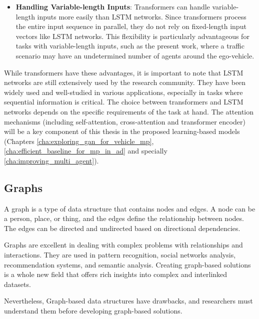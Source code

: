 \begin{itemize}
	\item \textbf{Handling Variable-length Inputs}: Transformers can handle variable-length inputs more easily than \ac{LSTM} networks. Since transformers process the entire input sequence in parallel, they do not rely on fixed-length input vectors like \ac{LSTM} networks. This flexibility is particularly advantageous for tasks with variable-length inputs, such as the present work, where a traffic scenario may have an undetermined number of agents around the ego-vehicle.
	
\end{itemize}

While transformers have these advantages, it is important to note that \ac{LSTM} networks are still extensively used by the research community. They have been widely used and well-studied in various applications, especially in tasks where sequential information is critical. The choice between transformers and \ac{LSTM} networks depends on the specific requirements of the task at hand. The attention mechanisms (including self-attention, cross-attention and transformer encoder) will be a key component of this thesis in the proposed learning-based models (Chapters \ref{cha:exploring_gan_for_vehicle_mp}, \ref{cha:efficient_baseline_for_mp_in_ad} and specially \ref{cha:improving_multi_agent}).

\subsection{Graphs}
\label{subsec:3_graphs}


A graph is a type of data structure that contains nodes and edges. A node can be a person, place, or thing, and the edges define the relationship between nodes. The edges can be directed and undirected based on directional dependencies. 

Graphs are excellent in dealing with complex problems with relationships and interactions. They are used in pattern recognition, social networks analysis, recommendation systems, and semantic analysis. Creating graph-based solutions is a whole new field that offers rich insights into complex and interlinked datasets. 

Nevertheless, Graph-based data structures have drawbacks, and researchers must understand them before developing graph-based solutions.

